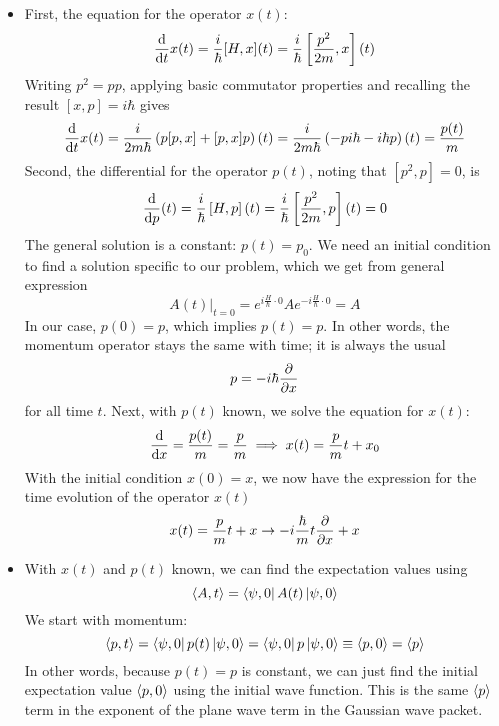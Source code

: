 \documentclass[11pt, a4paper]{article}
\begin{document}
\begin{itemize}
	\item First, the equation for the operator $ x(t) $:
	\begin{equation*}
		\dv{t}x(t) = \frac{i}{\hbar}[H, x](t) = \frac{i}{\hbar}\left [\frac{p^{2}}{2m}, x\right ](t)
	\end{equation*}
	Writing $ p^{2} = pp $, applying basic commutator properties and recalling the result $ [x, p] = i \hbar $ gives
	\begin{equation*}
		\dv{t}x(t) = \frac{i}{2m\hbar}\left(p[p, x] + [p, x]p\right)(t) = \frac{i}{2m\hbar}\left(-pi\hbar -i\hbar p\right)(t) = \frac{p(t)}{m}
	\end{equation*}
	Second, the differential for the operator $ p(t) $, noting that $ [p^{2}, p] = 0 $, is
	\begin{equation*}
		\dv{p}(t) = \frac{i}{\hbar}\left[H, p\right](t) = \frac{i}{\hbar}\left[\frac{p^{2}}{2m}, p\right](t) = 0
	\end{equation*}
	The general solution is a constant: $ p(t) = p_{0} $. We need an initial condition to find a solution specific to our problem, which we get from general expression
	\begin{equation*}
		A(t)\big |_{t = 0} = e^{i\frac{H}{\hbar}\cdot 0}Ae^{-i\frac{H}{\hbar}\cdot 0} = A
	\end{equation*}
	In our case, $ p(0) = p $, which implies $ p(t) = p$. In other words, the momentum operator stays the same with time; it is always the usual
	\begin{equation*}
		p = -i\hbar \pdv{x}
	\end{equation*}
	for all time $ t $. Next, with $ p(t) $ known, we solve the equation for $ x(t) $:
	\begin{equation*}
		\dv{x} = \frac{p(t)}{m} = \frac{p}{m} \implies x(t) = \frac{p}{m}t + x_{0}
	\end{equation*}
	With the initial condition $ x(0) = x $, we now have the expression for the time evolution of the operator $ x(t) $
	\begin{equation*}
		x(t) = \frac{p}{m}t + x \to -i\frac{\hbar}{m}t\pdv{x} + x
	\end{equation*}
	
	\item With $ x(t) $ and $ p(t) $ known, we can find the expectation values using
	\begin{equation*}
		\ev{A, t} = \bra{\psi, 0} A(t) \ket{\psi, 0}
	\end{equation*}
	We start with momentum:
	\begin{equation*}
		\ev{p, t} = \bra{\psi, 0} p(t) \ket{\psi, 0} = \bra{\psi, 0} p \ket{\psi, 0} \equiv \ev{p, 0} = \ev{p}
	\end{equation*}
	In other words, because $ p(t) = p $ is constant, we can just find the initial expectation value $ \ev{p, 0} $ using the initial wave function. This is the same $ \ev{p} $ term in the exponent of the plane wave term in the Gaussian wave packet. 
	

\end{itemize}
\end{document}
